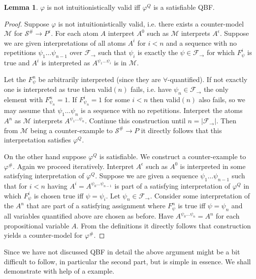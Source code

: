 \documentclass[a4paper,12pt]{report}
\theoremstyle{definition}
\theoremstyle{definition}
\theoremstyle{definition}
\newtheorem{lemma}[theorem]{Lemma}
\theoremstyle{definition}
\theoremstyle{definition}
\theoremstyle{definition}
\theoremstyle{definition}
\begin{document}
	
	\begin{lemma}
		$\varphi$ is not intuitionistically valid iff $\varphi^Q$ is a satisfiable QBF.
	\end{lemma}
	\begin{proof}
		Suppose $\varphi$ is not intuitionistically valid, i.e. there exists a counter-model $\mathcal M$ for $\mathcal S^\#\to P^\epsilon$. For each atom $A$ interpret $A^0$ such as $\mathcal M$ interprets $A^\epsilon$. Suppose we are given interpretations of all atoms $A^i$ for $i < n$ and a sequence with no repetitions $\psi_1\dots\psi_{n-1}$ over $\mathcal F_\to$ such that $\psi_i$ is exactly the $\psi\in\mathcal F_\to$ for which $F_{\psi}^i$ is true and $A^i$ is interpreted as $A^{\psi_1\dots\psi_i}$ is in $\mathcal M$.
		
		Let the $F^{n}_\psi$ be arbitrarily interpreted (since they are $\forall$-quantified). If not exactly one is interpreted as true then valid$(n)$ fails, i.e. have $\psi_n\in\mathcal F_\to$ the only element with $F^n_{\psi_n} = 1$. If $F^i_{\psi_n} = 1$ for some $i < n$ then valid$(n)$ also fails, so we may assume that $\psi_1\dots\psi_n$ is a sequence with no repetitions. Interpret the atoms $A^n$ as $\mathcal M$ interprets $A^{\psi_1\dots\psi_n}$. Continue this construction until $n  = |\mathcal F_\to|$. Then from $\mathcal M$ being a counter-example to $\mathcal S^\#\to P$ it directly follows that this interpretation satisfies $\varphi^Q$.
		
		On the other hand suppose $\varphi^Q$ is satisfiable. We construct a counter-example to $\varphi^\#$.
		Again we proceed iteratively. Interpret $A^\epsilon$ such as $A^0$ is interpreted in some satisfying interpretation of $\varphi^Q$. Suppose we are given a sequence $\psi_1\dots \psi_{n-1}$ such that for $i<n$ having $A^i = A^{\psi_0\dots\psi_{n-1}}$ is part of a satisfying interpretation of $\varphi^Q$ in which $F^i_\psi$ is chosen true iff $\psi = \psi_i$. Let $\psi_n\in\mathcal F_\to$. Consider some interpretation of the $A^n$ that are part of a satisfying assignment where $F^n_\psi$ is true iff $\psi = \psi_n$ and all variables quantified above are chosen as before. Have $A^{\psi_0\dots\psi_n} = A^n$ for each propositional variable $A$. From the definitions it directly follows that construction yields a counter-model for $\varphi^\#$.
	\end{proof}
	
	Since we have not discussed QBF in detail the above argument might be a bit difficult to follow, in particular the second part, but is simple in essence. We shall demonstrate with help of a example.
	
\end{document}
